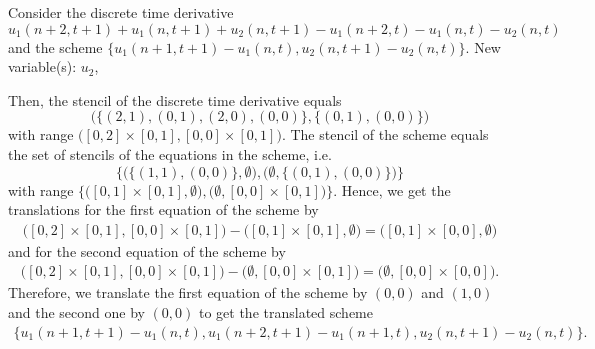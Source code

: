 \documentclass[runningheads]{llncs}
\newcommand{\1}{\chi}
\begin{document}
\begin{example}
	Consider the discrete time derivative
	\footnotesize
	\begin{equation*}
		u_1(n+2,t+1)+u_1(n,t+1)+u_2(n,t+1)-u_1(n+2,t)-u_1(n,t)-u_2(n,t)
	\end{equation*}
	\normalsize
	and the scheme
	\footnotesize
	\(
	\{u_1(n+1,t+1)-u_1(n,t),u_2(n,t+1)-u_2(n,t)\}.
	\)
{\color{blue} New variable(s): \(u_2\),  }

	\normalsize
	Then, the stencil of the discrete time derivative equals
	\footnotesize
	\begin{equation*}
		\Big( \big\{ (2,1),(0,1),(2,0),(0,0) \big\},\big\{(0,1),(0,0)\big\} \Big)
	\end{equation*}
	\normalsize
	with range
	\footnotesize
	\(
	\Big([0,2]\times[0,1],[0,0]\times [0,1]\Big).
	\)
	\normalsize
	The stencil of the scheme equals the set of stencils of the equations in the scheme, i.e.
	\footnotesize
	\begin{equation*}
		\Big\{\Big(\big\{(1,1),(0,0)\big\},\emptyset\Big),\Big(\emptyset,\big\{(0,1),(0,0)\big\}\Big)\Big\}
	\end{equation*}
	\normalsize
	with range
	\footnotesize
	\(
	\Big\{\Big([0,1]\times[0,1],\emptyset\Big),\Big(\emptyset,[0,0]\times [0,1]\Big)\Big\}.
	\)
	\normalsize
	Hence, we get the translations for the first equation of the scheme by
	\footnotesize
	\begin{gather*}
		\Big([0,2]\times[0,1],[0,0]\times [0,1]\Big)-\Big([0,1]\times[0,1],\emptyset\Big)=\Big([0,1]\times[0,0],\emptyset\Big)
	\end{gather*}
	\normalsize
	and for the second equation of the scheme by
	\footnotesize
	\begin{gather*}
		\Big([0,2]\times[0,1],[0,0]\times [0,1]\Big)-\Big(\emptyset,[0,0]\times [0,1]\Big)=\Big(\emptyset,[0,0]\times [0,0]\Big).
	\end{gather*}
	\normalsize
	Therefore, we translate the first equation of the scheme by \((0,0)\) and \((1,0)\) and the second one by \((0,0)\) to get the translated scheme
	\footnotesize
	\begin{gather*}
		\{u_1(n+1,t+1)-u_1(n,t),
		u_1(n+2,t+1)-u_1(n+1,t),
		u_2(n,t+1)-u_2(n,t)
		\}.
	\end{gather*}
	\normalsize
\end{example}
\end{document}
